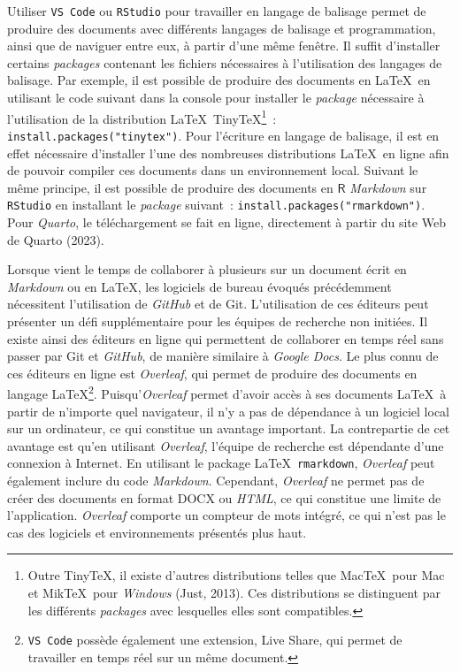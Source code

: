 \documentclass[
  letterpaper,
  DIV=11,
  numbers=noendperiod,
  oneside]{scrreprt}
\begin{document}
Utiliser \texttt{VS\ Code} ou \texttt{RStudio} pour travailler en
langage de balisage permet de produire des documents avec différents
langages de balisage et programmation, ainsi que de naviguer entre eux,
à partir d'une même fenêtre. Il suffit d'installer certains
\emph{packages} contenant les fichiers nécessaires à l'utilisation des
langages de balisage. Par exemple, il est possible de produire des
documents en \LaTeX{}~en utilisant le code suivant dans la console pour
installer le \emph{package} nécessaire à l'utilisation de la
distribution \LaTeX{}~Tiny\TeX\footnote{Outre Tiny\TeX, il existe
  d'autres distributions telles que Mac\TeX{}~pour Mac et Mik\TeX{}~pour
  \emph{Windows} (Just, 2013). Ces distributions se distinguent par les
  différents \emph{packages} avec lesquelles elles sont compatibles.}~:
\texttt{install.packages("tinytex")}. Pour l'écriture en langage de
balisage, il est en effet nécessaire d'installer l'une des nombreuses
distributions \LaTeX{}~en ligne afin de pouvoir compiler ces documents
dans un environnement local. Suivant le même principe, il est possible
de produire des documents en \(\textsf{R}\) \emph{Markdown} sur
\texttt{RStudio} en installant le \emph{package} suivant~:
\texttt{install.packages("rmarkdown")}. Pour \emph{Quarto}, le
téléchargement se fait en ligne, directement à partir du site Web de
Quarto (2023).

Lorsque vient le temps de collaborer à plusieurs sur un document écrit
en \emph{Markdown} ou en \LaTeX{}, les logiciels de bureau évoqués
précédemment nécessitent l'utilisation de \emph{GitHub} et de Git.
L'utilisation de ces éditeurs peut présenter un défi supplémentaire pour
les équipes de recherche non initiées. Il existe ainsi des éditeurs en
ligne qui permettent de collaborer en temps réel sans passer par Git et
\emph{GitHub}, de manière similaire à \emph{Google Docs}. Le plus connu
de ces éditeurs en ligne est \emph{Overleaf}, qui permet de produire des
documents en langage \LaTeX{}\footnote{\texttt{VS\ Code} possède
  également une extension, Live Share, qui permet de travailler en temps
  réel sur un même document.}. Puisqu'\emph{Overleaf} permet d'avoir
accès à ses documents \LaTeX{}~à partir de n'importe quel navigateur, il
n'y a pas de dépendance à un logiciel local sur un ordinateur, ce qui
constitue un avantage important. La contrepartie de cet avantage est
qu'en utilisant \emph{Overleaf}, l'équipe de recherche est dépendante
d'une connexion à Internet. En utilisant le package
\LaTeX{}~\texttt{rmarkdown}, \emph{Overleaf} peut également inclure du
code \emph{Markdown}. Cependant, \emph{Overleaf} ne permet pas de créer
des documents en format DOCX ou \emph{HTML}, ce qui constitue une limite
de l'application. \emph{Overleaf} comporte un compteur de mots intégré,
ce qui n'est pas le cas des logiciels et environnements présentés plus
haut.
\end{document}

